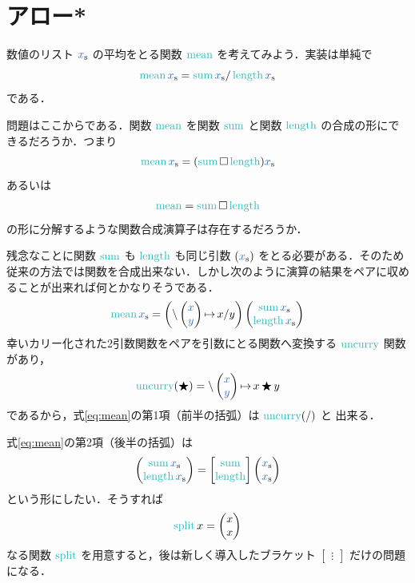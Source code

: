 \documentclass[a5paper,twoside,fleqn,draft]{jsbook}
\begin{document}
\section{アロー*}

数値のリスト $\mList{x}$ の平均をとる関数 $\mMean$ を考えてみよう．実装は単純で
\begin{equation}
  \mMean\mList{x}
  =\mSum\mList{x}/\mLength\mList{x}
\end{equation}
である．

問題はここからである．関数 $\mMean$ を関数 $\mSum$ と関数 $\mLength$ の合成の形にできるだろうか．つまり
\begin{equation}
  \mMean\mList{x}
  =(\mSum\mSomeOp\mLength)\mList{x}
\end{equation}
あるいは
\begin{equation}
  \mMean
  =\mSum\mSomeOp\mLength
\end{equation}
の形に分解するような関数合成演算子は存在するだろうか．

残念なことに関数 $\mSum$ も $\mLength$ も同じ引数 $(\mList{x})$ をとる必要がある．そのため従来の方法では関数を合成出来ない．しかし次のように演算の結果をペアに収めることが出来れば何とかなりそうである．
\begin{equation}
  \label{eq:mean}
  \mMean\mList{x}
  =
  \left(\mLambda\mPairWith{\hVar{x}}{\hVar{y}}\mLambdaArrow x/y\right)\mPairWith{\mSum\mList{x}}{\mLength\mList{x}}
\end{equation}
幸いカリー化された2引数関数をペアを引数にとる関数へ変換する
$\mUncurry$ 関数があり，
\begin{equation}
  \mUncurry(\hAnyBinOp)
  =\mLambda\mPairWith{\hVar{x}}{\hVar{y}}\mLambdaArrow x\hAnyBinOp y
\end{equation}
であるから，式\eqref{eq:mean}の第1項（前半の括弧）は $\mUncurry(/)$ と
出来る．

式\eqref{eq:mean}の第2項（後半の括弧）は
\begin{equation}
  \mPairWith{\mSum\mList{x}}{\mLength\mList{x}}
  =\begin{bmatrix}
  \mSum\\
  \mLength
  \end{bmatrix}
  \mPairWith{\mList{x}}{\mList{x}}
\end{equation}
という形にしたい．そうすれば
\begin{equation}
  \mSplit x
  =\mPairWith{x}{x}
\end{equation}
なる関数 $\mSplit$ を用意すると，後は新しく導入したブラケット
$\begin{bmatrix}\vdots\end{bmatrix}$ だけの問題になる．
\end{document}
